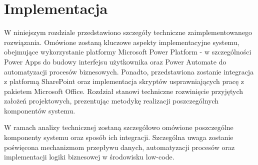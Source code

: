 \chapter{Implementacja}

W niniejszym rozdziale przedstawiono szczegóły techniczne zaimplementowanego rozwiązania. Omówione zostaną kluczowe aspekty
implementacyjne systemu, obejmujące wykorzystanie platformy Microsoft Power Platform - w szczególności
Power Apps do budowy interfejsu użytkownika oraz Power Automate do automatyzacji procesów biznesowych.
Ponadto, przedstawiona zostanie integracja z platformą SharePoint oraz implementacja skryptów
usprawniających pracę z pakietem Microsoft Office. Rozdział stanowi techniczne rozwinięcie przyjętych
założeń projektowych, prezentując metodykę realizacji poszczególnych komponentów systemu.

W ramach analizy technicznej zostaną szczegółowo omówione poszczególne komponenty systemu oraz sposób
ich integracji. Szczególna uwaga zostanie poświęcona mechanizmom przepływu danych, automatyzacji
procesów oraz implementacji logiki biznesowej w środowisku low-code.

